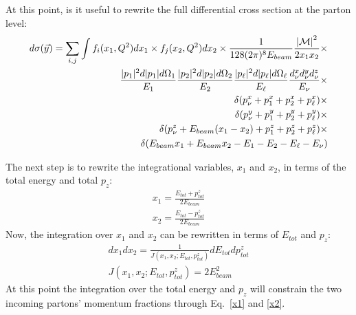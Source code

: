 At this point, is it useful to rewrite the full differential cross
section at the parton level:
\begin{eqnarray}
\nonumber
d\sigma(\vec{y}) = \sum_{i,j} \int f_{i}(x_{1}, Q^{2})dx_{1}
\times f_{j}(x_{2}, Q^{2})dx_{2}
\times \frac{1}{128(2\pi)^{8}E_{beam}}
\frac{{|\cal M|}^{2}}{2x_{1}x_{2}} \times \\
\nonumber
\frac{|p_{1}|^{2}d|p_{1}|d\Omega_{1}}{E_{1}}
\frac{|p_{2}|^{2}d|p_{2}|d\Omega_{2}}{E_{2}}
\frac{|p_{\ell}|^{2}d|p_{\ell}|d\Omega_{\ell}}{E_{\ell}}
\frac{d^{x}_{\nu} d^{y}_{\nu} d^{z}_{\nu}}{E_{\nu}} \times \\
\nonumber
\delta(p^{x}_{\nu} + p^{x}_{1} + p^{x}_{2} + p^{x}_{\ell}) \times \\
\nonumber
\delta(p^{y}_{\nu} + p^{y}_{1} + p^{y}_{2} + p^{y}_{\ell}) \times \\
\nonumber
\delta(p^{z}_{\nu} + E_{beam}(x_{1} - x_{2}) + p^{z}_{1}
+ p^{z}_{2} + p^{z}_{\ell}) \times \\
\delta(E_{beam}x_{1} + E_{beam}x_{2} - E_{1} - E_{2}
- E_{\ell} - E_{\nu})
\end{eqnarray}

The next step is to rewrite the integrational variables, $x_{1}$ and
$x_{2}$, in terms of the total energy and total $p_{z}$:
\begin{eqnarray}
\label{x1}
x_{1} = \frac{E_{tot} + p^{z}_{tot}}{2E_{beam}} \\
\label{x2}
x_{2} = \frac{E_{tot} - p^{z}_{tot}}{2E_{beam}}
\end{eqnarray}
\noindent Now, the integration over $x_{1}$ and $x_{2}$ can be
rewritten in terms of $E_{tot}$ and $p_{z}$:
\begin{eqnarray}
dx_{1}dx_{2} =
\frac{1}{J(x_{1},x_{2};E_{tot},p^{z}_{tot})}dE_{tot}dp^{z}_{tot} \\
J(x_{1},x_{2};E_{tot},p^{z}_{tot}) = 2E^{2}_{beam}
\end{eqnarray}
\noindent At this point the integration over the total energy and
$p_{z}$ will constrain the two incoming partons' momentum fractions
through Eq.~\ref{x1} and \ref{x2}.

